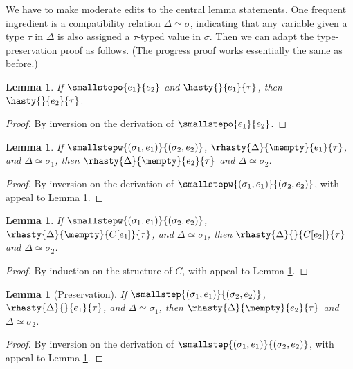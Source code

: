 \documentclass{amsbook}
\newtheorem{lemma}[theorem]{Lemma}
\theoremstyle{definition}
\theoremstyle{remark}
\numberwithin{section}{chapter}
\numberwithin{equation}{chapter}
\begin{document}
We have to make moderate edits to the central lemma statements.
One frequent ingredient is a compatibility relation $\Delta \simeq \sigma$, indicating that any variable given a type $\tau$ in $\Delta$ is also assigned a $\tau$-typed value in $\sigma$.
Then we can adapt the type-preservation proof as follows.
(The progress proof works essentially the same as before.)

\begin{lemma}\label{mutable_preservation0}
  If $\smallstepo{e_1}{e_2}$ and $\hasty{}{e_1}{\tau}$, then $\hasty{}{e_2}{\tau}$.
\end{lemma}
\begin{proof}
  By inversion on the derivation of $\smallstepo{e_1}{e_2}$.
\end{proof}

\begin{lemma}\label{preservation1}
  If $\smallstepw{(\sigma_1, e_1)}{(\sigma_2, e_2)}$, $\rhasty{\Delta}{\mempty}{e_1}{\tau}$, and $\Delta \simeq \sigma_1$, then $\rhasty{\Delta}{\mempty}{e_2}{\tau}$ and $\Delta \simeq \sigma_2$.
\end{lemma}
\begin{proof}
  By inversion on the derivation of $\smallstepw{(\sigma_1, e_1)}{(\sigma_2, e_2)}$, with appeal to Lemma \ref{mutable_preservation0}.
\end{proof}

\begin{lemma}\label{mutable_preservation_prime}
  If $\smallstepw{(\sigma_1, e_1)}{(\sigma_2, e_2)}$, $\rhasty{\Delta}{\mempty}{C[e_1]}{\tau}$, and $\Delta \simeq \sigma_1$, then $\rhasty{\Delta}{}{C[e_2]}{\tau}$ and $\Delta \simeq \sigma_2$.
\end{lemma}
\begin{proof}
  By induction on the structure of $C$, with appeal to Lemma \ref{preservation1}.
\end{proof}

\begin{lemma}[Preservation]\label{mutable_preservation}
  If $\smallstep{(\sigma_1, e_1)}{(\sigma_2, e_2)}$, $\rhasty{\Delta}{}{e_1}{\tau}$, and $\Delta \simeq \sigma_1$, then $\rhasty{\Delta}{\mempty}{e_2}{\tau}$ and $\Delta \simeq \sigma_2$.
\end{lemma}
\begin{proof}
  By inversion on the derivation of $\smallstep{(\sigma_1, e_1)}{(\sigma_2, e_2)}$, with appeal to Lemma \ref{mutable_preservation_prime}.
\end{proof}
\end{document}
